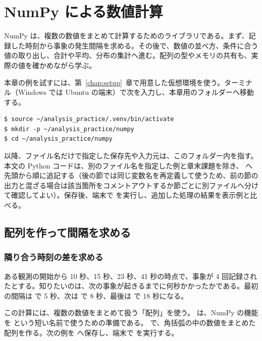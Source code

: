 \chapter{NumPy による数値計算}
\label{chap:numpy}

NumPy は、複数の数値をまとめて計算するためのライブラリである。まず、記録した時刻から事象の発生間隔を求める。その後で、数値の並べ方、条件に合う値の取り出し、合計や平均、分布の集計へ進む。配列の型やメモリの共有も、実際の値を確かめながら学ぶ。

本章の例を試すには、第~\ref{chap:setup}~章で用意した仮想環境を使う。ターミナル（Windows では Ubuntu の端末）で次を入力し、本章用のフォルダーへ移動する。

\begin{lstlisting}[numbers=none, xleftmargin=2\zw]
$ source ~/analysis_practice/.venv/bin/activate
$ mkdir -p ~/analysis_practice/numpy
$ cd ~/analysis_practice/numpy
\end{lstlisting}

以降、ファイル名だけで指定した保存先や入力元は、このフォルダー内を指す。本文の Python コードは、別のファイル名を指定した例と章末課題を除き、 へ先頭から順に追記する（後の節では同じ変数名を再定義して使うため、前の節の出力と混ざる場合は該当箇所をコメントアウトするか節ごとに別ファイルへ分けて確認してよい）。保存後、端末で  を実行し、追加した処理の結果を表示例と比べる。

\section{配列を作って間隔を求める}

\subsection{隣り合う時刻の差を求める}

ある観測の開始から 10 秒、15 秒、23 秒、41 秒の時点で、事象が 4 回記録されたとする。知りたいのは、次の事象が起きるまでに何秒かかったかである。最初の間隔は  で 5 秒、次は  で 8 秒、最後は  で 18 秒になる。

この計算には、複数の数値をまとめて扱う「配列」を使う。 は、NumPy の機能を  という短い名前で使うための準備である。 で、角括弧の中の数値をまとめた配列を作る。次の例を  へ保存し、端末で  を実行する。

